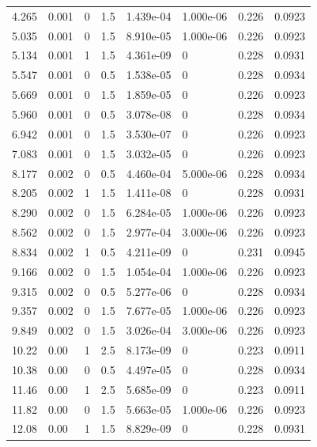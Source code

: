 \documentclass[preview]{standalone}
\begin{document}
{{\begin{tabular}{L{1.2cm}C{1.2cm} C{0.3cm}C{0.5cm} C{1.4cm}C{1.4cm} C{1.4cm}C{1.4cm}}
  4.265  &  0.001  & 0     & 1.5 &  1.439e-04  & 1.000e-06  & 0.226 &  0.0923   \\ 
  5.035  &  0.001  & 0     & 1.5 &  8.910e-05  & 1.000e-06  & 0.226 &  0.0923   \\ 
  5.134  &  0.001  & 1     & 1.5 &  4.361e-09  & 0  & 0.228 &  0.0931   \\ 
  5.547  &  0.001  & 0     & 0.5 &  1.538e-05  & 0  & 0.228 &  0.0934   \\ 
  5.669  &  0.001  & 0     & 1.5 &  1.859e-05  & 0  & 0.226 &  0.0923   \\ 
  5.960  &  0.001  & 0     & 0.5 &  3.078e-08  & 0  & 0.228 &  0.0934   \\ 
  6.942  &  0.001  & 0     & 1.5 &  3.530e-07  & 0  & 0.226 &  0.0923   \\ 
  7.083  &  0.001  & 0     & 1.5 &  3.032e-05  & 0  & 0.226 &  0.0923   \\ 
  8.177  &  0.002  & 0     & 0.5 &  4.460e-04  & 5.000e-06  & 0.228 &  0.0934   \\ 
  8.205  &  0.002  & 1     & 1.5 &  1.411e-08  & 0  & 0.228 &  0.0931   \\ 
  8.290  &  0.002  & 0     & 1.5 &  6.284e-05  & 1.000e-06  & 0.226 &  0.0923   \\ 
  8.562  &  0.002  & 0     & 1.5 &  2.977e-04  & 3.000e-06  & 0.226 &  0.0923   \\ 
  8.834  &  0.002  & 1     & 0.5 &  4.211e-09  & 0  & 0.231 &  0.0945   \\ 
  9.166  &  0.002  & 0     & 1.5 &  1.054e-04  & 1.000e-06  & 0.226 &  0.0923   \\ 
  9.315  &  0.002  & 0     & 0.5 &  5.277e-06  & 0  & 0.228 &  0.0934   \\ 
  9.357  &  0.002  & 0     & 1.5 &  7.677e-05  & 1.000e-06  & 0.226 &  0.0923   \\ 
  9.849  &  0.002  & 0     & 1.5 &  3.026e-04  & 3.000e-06  & 0.226 &  0.0923   \\ 
  10.22  &  0.00  & 1     & 2.5 &  8.173e-09  & 0  & 0.223 &  0.0911   \\ 
  10.38  &  0.00  & 0     & 0.5 &  4.497e-05  & 0  & 0.228 &  0.0934   \\ 
  11.46  &  0.00  & 1     & 2.5 &  5.685e-09  & 0  & 0.223 &  0.0911   \\ 
  11.82  &  0.00  & 0     & 1.5 &  5.663e-05  & 1.000e-06  & 0.226 &  0.0923   \\ 
  12.08  &  0.00  & 1     & 1.5 &  8.829e-09  & 0  & 0.228 &  0.0931   \\ 

\end{tabular}}}
\end{document}

